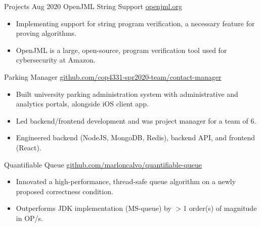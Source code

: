 \documentclass{resume}
\begin{document}
  \begin{fieldlist}{Projects}
    \fieldnotitle
      {Aug 2020}
      {OpenJML String Support}
      {\href{http://www.openjml.org/}{openjml.org}}
      {
        \begin{itemize}
          \item Implementing support for string program verification, a necessary feature for proving algorithms.
          \item OpenJML is a large, open-source, program verification tool used for cybersecurity at Amazon.
        \end{itemize}
      }

      {Parking Manager}
      {\href{https://github.com/cop4331-spr2020-team/contact-manager}{github.com/cop4331-spr2020-team/contact-manager}}
      {
        \begin{itemize}
          \setlength\itemsep{0em}
          \item Built university parking administration system with administrative and analytics portals, alongside iOS client app.
          \item Led backend/frontend development and was project manager for a team of 6.
          \item Engineered backend (NodeJS, MongoDB, Redis), backend API, and frontend (React).
        \end{itemize}
      }

      {Quantifiable Queue}
      {\href{https://github.com/marloncalvo/quantifiable-queue}{github.com/marloncalvo/quantifiable-queue}}
      {
        \begin{itemize}
          \item Innovated a high-performance, thread-safe queue algorithm on a newly proposed correctness condition.
          \item Outperforms JDK implementation (MS-queue) by $>$1 order(s) of magnitude in OP/s.
        \end{itemize}
      }



  \end{fieldlist}
\end{document}
